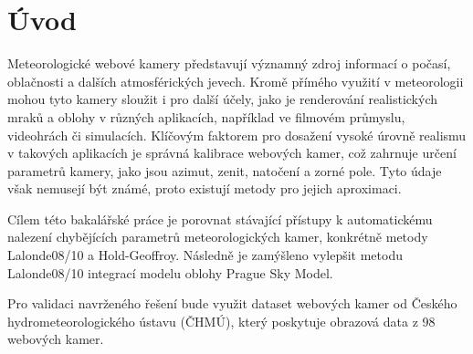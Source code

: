 \chapter*{Úvod}

Meteorologické webové kamery představují významný zdroj informací o počasí, oblačnosti a dalších atmosférických jevech. Kromě přímého využití v meteorologii mohou tyto kamery sloužit i pro další účely, jako je renderování realistických mraků a oblohy v různých aplikacích, například ve filmovém průmyslu, videohrách či simulacích. Klíčovým faktorem pro dosažení vysoké úrovně realismu v takových aplikacích je správná kalibrace webových kamer, což zahrnuje určení parametrů kamery, jako jsou azimut, zenit, natočení a zorné pole. Tyto údaje však nemusejí být známé, proto existují metody pro jejich aproximaci.

Cílem této bakalářské práce je porovnat stávající přístupy k automatickému nalezení chybějících parametrů meteorologických kamer, konkrétně metody Lalonde08/10 a Hold-Geoffroy. Následně je zamýšleno vylepšit metodu Lalonde08/10 integrací modelu oblohy Prague Sky Model.

Pro validaci navrženého řešení  bude využit dataset webových kamer od Českého hydrometeorologického ústavu (ČHMÚ), který poskytuje obrazová data z 98 webových kamer.